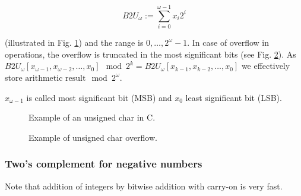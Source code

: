 \begin{equation}
    B2U_{\omega} := \sum_{i=0}^{\omega-1} x_i 2^i
\end{equation}

(illustrated in Fig. \ref{fig:unchar}) and the range is $0,\dots,2^\omega - 1$. In case of overflow in operations, the overflow is truncated
in the most significant bits (see Fig. \ref{fig:uncharadd}). As $B2U_{\omega}[x_{\omega-1},x_{\omega-2},\dots,x_0] \mod 2^k = 
B2U_{\omega}[x_{k-1},x_{k-2},\dots,x_0]$ we effectively store $\text{arithmetic result}\mod 2^\omega$.

$x_{\omega-1}$ is called most significant bit (MSB) and $x_0$ least significant bit (LSB).


\begin{figure}[!htb]
 \centering
 \hfill
 \caption{Example of an unsigned char in C.}
 \label{fig:unchar}
\end{figure}

\begin{figure}[!htb]
    \centering
    \hfill
    \caption{Example of unsigned char overflow.}
    \label{fig:uncharadd}
\end{figure}

\subsubsection{Two's complement for negative numbers}
Note that addition of integers by bitwise addition with carry-on is very fast.


